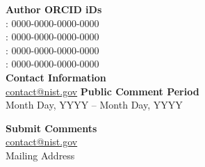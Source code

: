 \begin{titlepage}
\begin{flushleft}
{\textbf{Author ORCID iDs}}\\
 \authorone: 0000-0000-0000-0000\\
\authortwo: 0000-0000-0000-0000\\
\authorthree: 0000-0000-0000-0000\\
\authorfour: 0000-0000-0000-0000\\
\vfill
{\textbf{Contact Information}}\\
{\href{mailto:contact@nist.gov}{contact@nist.gov}}
\vfill
{\textbf{Public Comment Period}}\\
Month Day, YYYY – Month Day, YYYY

{\textbf{Submit Comments}}\\ 
{\href{mailto:contact@nist.gov}{contact@nist.gov}} \\
Mailing Address

\end{flushleft}


\end{titlepage}
